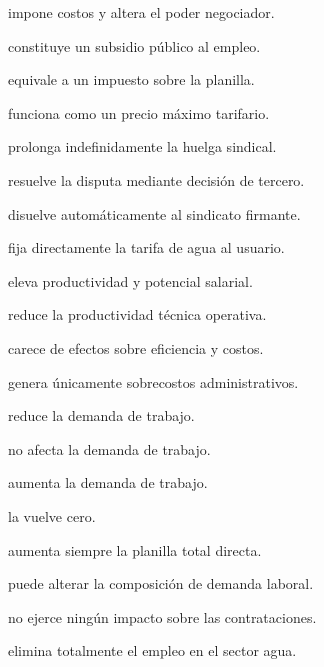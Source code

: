 \begin{opts}
    \item impone costos y altera el poder negociador.
    \item constituye un subsidio público al empleo.
    \item equivale a un impuesto sobre la planilla.
    \item funciona como un precio máximo tarifario.
\end{opts}

\begin{opts}
    \item prolonga indefinidamente la huelga sindical.
    \item resuelve la disputa mediante decisión de tercero.
    \item disuelve automáticamente al sindicato firmante.
    \item fija directamente la tarifa de agua al usuario.
\end{opts}

\begin{opts}
    \item eleva productividad y potencial salarial.
    \item reduce la productividad técnica operativa.
    \item carece de efectos sobre eficiencia y costos.
    \item genera únicamente sobrecostos administrativos.
\end{opts}

\begin{opts}
    \item reduce la demanda de trabajo.
    \item no afecta la demanda de trabajo.
    \item aumenta la demanda de trabajo.
    \item la vuelve cero.
\end{opts}

\begin{opts}
    \item aumenta siempre la planilla total directa.
    \item puede alterar la composición de demanda laboral.
    \item no ejerce ningún impacto sobre las contrataciones.
    \item elimina totalmente el empleo en el sector agua.
\end{opts}

